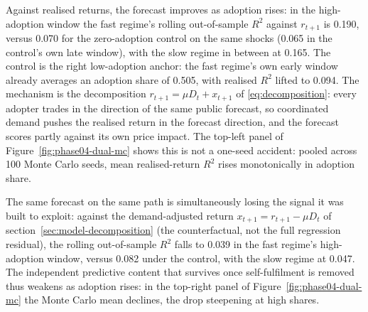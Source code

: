\documentclass[12pt]{article}
\begin{document}
Against realised returns, the forecast improves as adoption rises: in the high-adoption window the fast regime's rolling out-of-sample $R^{2}$ against $r_{t+1}$ is 0.190, versus 0.070 for the zero-adoption control on the same shocks (0.065 in the control's own late window), with the slow regime in between at 0.165. %
The control is the right low-adoption anchor: the fast regime's own early window already averages an adoption share of 0.505, with realised $R^{2}$ lifted to 0.094. %
The mechanism is the decomposition $r_{t+1}=\mu D_t + x_{t+1}$ of \eqref{eq:decomposition}: every adopter trades in the direction of the same public forecast, so coordinated demand pushes the realised return in the forecast direction, and the forecast scores partly against its own price impact. The top-left panel of Figure~\ref{fig:phase04-dual-mc} shows this is not a one-seed accident: pooled across 100 Monte Carlo seeds, mean realised-return $R^{2}$ rises monotonically in adoption share. %

The same forecast on the same path is simultaneously losing the signal it was built to exploit: against the demand-adjusted return $x_{t+1}=r_{t+1}-\mu D_t$ of section~\ref{sec:model-decomposition} (the counterfactual, not the full regression residual), the rolling out-of-sample $R^{2}$ falls to 0.039 in the fast regime's high-adoption window, versus 0.082 under the control, with the slow regime at 0.047. %
The independent predictive content that survives once self-fulfilment is removed thus weakens as adoption rises: in the top-right panel of Figure~\ref{fig:phase04-dual-mc} the Monte Carlo mean declines, the drop steepening at high shares. %
\end{document}
